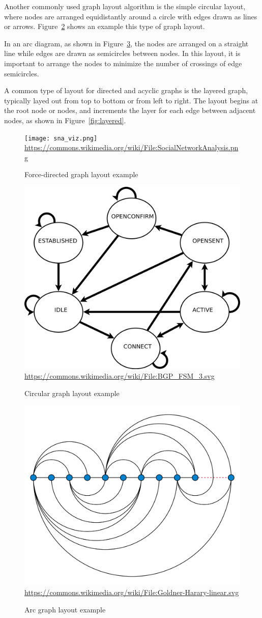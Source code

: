 Another commonly used graph layout algorithm is the simple circular layout, where nodes are arranged equidistantly around a circle with edges drawn as lines or arrows. Figure~\ref{fig:circular} shows an example this type of graph layout.

In an arc diagram, as shown in Figure~\ref{fig:arc}, the nodes are arranged on a straight line while edges are drawn as semicircles between nodes. In this layout, it is important to arrange the nodes to minimize the number of crossings of edge semicircles. 

A common type of layout for directed and acyclic graphs is the layered graph, typically layed out from top to bottom or from left to right. The layout begins at the root node or nodes, and increments the layer for each edge between adjacent nodes, as shown in Figure~\ref{fig:layered}.

\begin{figure}
\centering
\texttt{[image: sna\_viz.png]} \\

\scriptsize \url{https://commons.wikimedia.org/wiki/File:SocialNetworkAnalysis.png}
\caption{Force-directed graph layout example} 
\label{fig:sna_viz}
\end{figure}

\begin{figure}
\centering
\includegraphics[width=.5\textwidth]{circular.png} \\

\scriptsize \url{https://commons.wikimedia.org/wiki/File:BGP_FSM_3.svg}
\caption{Circular graph layout example} 
\label{fig:circular}
\end{figure}

\begin{figure}
\centering
\includegraphics[width=.5\textwidth]{arc.png} \\

\scriptsize \url{https://commons.wikimedia.org/wiki/File:Goldner-Harary-linear.svg}
\caption{Arc graph layout example} 
\label{fig:arc}
\end{figure}

